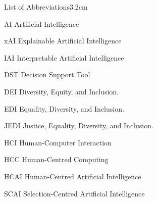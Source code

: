 \begin{mclistof}{List of Abbreviations}{3.2cm}
    \item[AI] Artificial Intelligence
    \item[xAI] Explainable Artificial Intelligence
    \item[IAI] Interpretable Artificial Intelligence
    
    \item[DST] Decision Support Tool
    
    \item[DEI] Diversity, Equity, and Inclusion.
    \item[EDI] Equality, Diversity, and Inclusion.
    \item[JEDI] Justice, Equality, Diversity, and Inclusion.

    \item[HCI] Human-Computer Interaction
    \item[HCC] Human-Centred Computing
    \item[HCAI] Human-Centred Artificial Intelligence
    \item[SCAI] Selection-Centred Artificial Intelligence
\end{mclistof}